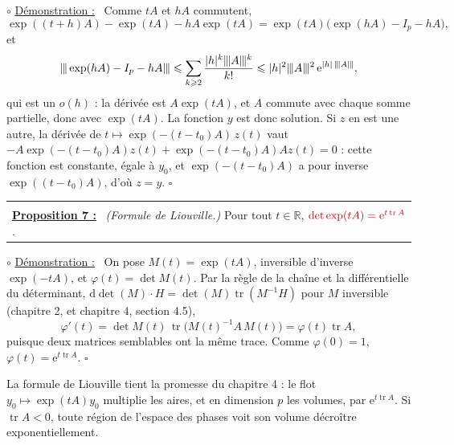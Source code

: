 \documentclass[a4paper,twoside]{report}
\makeatletter
\newcommand{\rmath}[1]{\textcolor{rougecours}{#1}}
\newenvironment{cadre}%
 {\par\vspace{2mm}\noindent\begin{tabular}{|@{\hspace{4mm}}p{0.93\textwidth}@{\hspace{4mm}}|}
  \hline \\[-2mm]}%
 {\\[2mm] \hline \end{tabular}\par\vspace{3mm}}
\newcommand{\propo}[1]{\textbf{\underline{Proposition #1 :}}~}
\newenvironment{demo}%
 {\par\needspace{4\baselineskip}\vspace{1mm}\noindent$\circ$ \underline{Démonstration :}~\setlength{\parskip}{3pt plus 1pt}}%
 {\hfill$\square$\par\vspace{2mm}}
\newcommand{\R}{\mathbb{R}}
\newcommand{\ee}{\mathrm{e}}                      %
\newcommand{\dd}{\mathrm{d}}                      %
\newcommand{\tr}{\operatorname{tr}}               %
\newcommand{\nop}[1]{|\mkern-1.5mu|\mkern-1.5mu|#1|\mkern-1.5mu|\mkern-1.5mu|}   %
\makeatother
\begin{document}
\begin{demo}
Comme $tA$ et $hA$ commutent,
\[ \exp((t + h)A) - \exp(tA) - hA\exp(tA) = \exp(tA)\big(\exp(hA) - I_{p} - hA\big), \]
et
\[ \nop{\exp(hA) - I_{p} - hA} \leqslant \sum_{k \geqslant 2} \frac{|h|^{k}\nop{A}^{k}}{k!} \leqslant |h|^{2}\nop{A}^{2}\,\ee^{|h|\,\nop{A}}, \]
qui est un $o(h)$ : la dérivée est $A\exp(tA)$, et $A$ commute avec chaque somme partielle, donc avec $\exp(tA)$. La fonction $y$ est donc solution. Si $z$ en est une autre, la dérivée de $t \mapsto \exp(-(t - t_{0})A)\,z(t)$ vaut $-A\exp(-(t - t_{0})A)z(t) + \exp(-(t - t_{0})A)Az(t) = 0$ : cette fonction est constante, égale à $y_{0}$, et $\exp(-(t - t_{0})A)$ a pour inverse $\exp((t - t_{0})A)$, d'où $z = y$.
\end{demo}

\begin{cadre}
\propo{7} \emph{(Formule de Liouville.)} Pour tout $t \in \R$, $\rmath{\det\exp(tA) = \ee^{t\tr A}}$.
\end{cadre}

\begin{demo}
On pose $M(t) = \exp(tA)$, inversible d'inverse $\exp(-tA)$, et $\varphi(t) = \det M(t)$. Par la règle de la chaîne et la différentielle du déterminant, $\dd\det(M)\cdot H = \det(M)\tr(M^{-1}H)$ pour $M$ inversible (chapitre 2, et chapitre 4, section 4.5),
\[ \varphi'(t) = \det M(t)\,\tr\big(M(t)^{-1}A\,M(t)\big) = \varphi(t)\tr A, \]
puisque deux matrices semblables ont la même trace. Comme $\varphi(0) = 1$, $\varphi(t) = \ee^{t\tr A}$.
\end{demo}

\noindent La formule de Liouville tient la promesse du chapitre 4 : le flot $y_{0} \mapsto \exp(tA)y_{0}$ multiplie les aires, et en dimension $p$ les volumes, par $\ee^{t\tr A}$. Si $\tr A < 0$, toute région de l'espace des phases voit son volume décroître exponentiellement.
\end{document}
